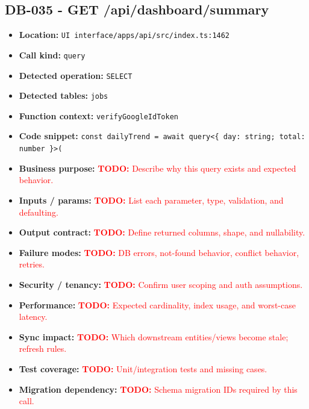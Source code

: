\documentclass[11pt]{article}
\newcommand{\todoitem}[1]{\textcolor{red}{\textbf{TODO:} #1}}
\begin{document}
\subsection{DB-035 - GET /api/dashboard/summary}
\begin{itemize}[leftmargin=1.5em]
\item \textbf{Location:} \texttt{UI interface/apps/api/src/index.ts:1462}
\item \textbf{Call kind:} \texttt{query}
\item \textbf{Detected operation:} \texttt{SELECT}
\item \textbf{Detected tables:} \texttt{jobs}
\item \textbf{Function context:} \texttt{verifyGoogleIdToken}
\item \textbf{Code snippet:} \texttt{const dailyTrend = await query<\{ day: string; total: number \}>(}
\item \textbf{Business purpose:} \todoitem{Describe why this query exists and expected behavior.}
\item \textbf{Inputs / params:} \todoitem{List each parameter, type, validation, and defaulting.}
\item \textbf{Output contract:} \todoitem{Define returned columns, shape, and nullability.}
\item \textbf{Failure modes:} \todoitem{DB errors, not-found behavior, conflict behavior, retries.}
\item \textbf{Security / tenancy:} \todoitem{Confirm user scoping and auth assumptions.}
\item \textbf{Performance:} \todoitem{Expected cardinality, index usage, and worst-case latency.}
\item \textbf{Sync impact:} \todoitem{Which downstream entities/views become stale; refresh rules.}
\item \textbf{Test coverage:} \todoitem{Unit/integration tests and missing cases.}
\item \textbf{Migration dependency:} \todoitem{Schema migration IDs required by this call.}
\end{itemize}
\end{document}
